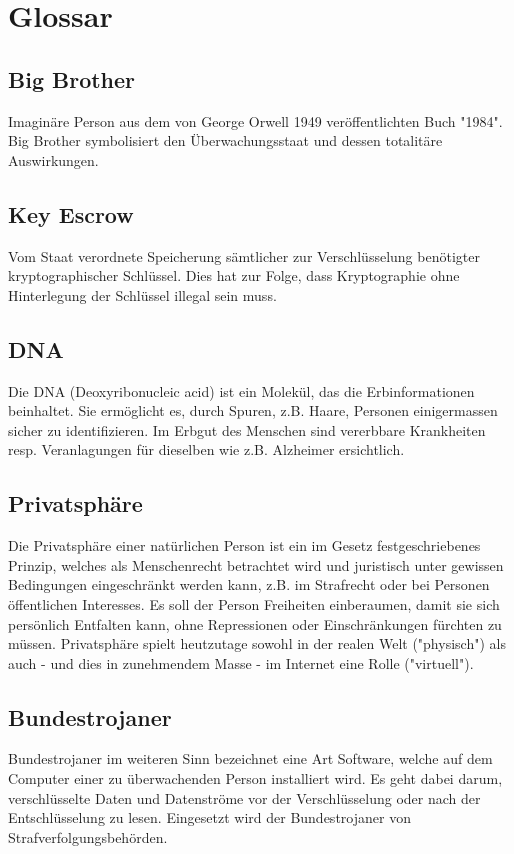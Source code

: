 \section*{
Glossar
}

\subsection*{
Big Brother 
}
Imagin\"are Person aus dem von George Orwell 1949 ver\"offentlichten 
Buch "1984". Big Brother symbolisiert den \"Uberwachungsstaat und dessen 
totalit\"are Auswirkungen. 

\subsection*{
Key Escrow 
}
Vom Staat verordnete Speicherung s\"amtlicher zur Verschl\"usselung 
ben\"otigter kryptographischer Schl\"ussel. Dies hat zur Folge, dass 
Kryptographie ohne Hinterlegung der Schl\"ussel illegal sein muss. 

\subsection*{
DNA 
}
Die DNA (Deoxyribonucleic acid) ist ein Molek\"ul, das die 
Erbinformationen beinhaltet. Sie erm\"oglicht es, durch Spuren, z.B. 
Haare, Personen einigermassen sicher zu identifizieren. Im Erbgut des 
Menschen sind vererbbare Krankheiten resp. Veranlagungen f\"ur dieselben 
wie z.B. Alzheimer ersichtlich. 

\subsection*{
Privatsph\"are 
}
Die Privatsph\"are einer nat\"urlichen Person ist ein im Gesetz 
festgeschriebenes Prinzip, welches als Menschenrecht betrachtet wird und 
juristisch unter gewissen Bedingungen eingeschr\"ankt werden kann, z.B. 
im Strafrecht oder bei Personen \"offentlichen Interesses. Es soll der 
Person Freiheiten einberaumen, damit sie sich pers\"onlich Entfalten 
kann, ohne Repressionen oder Einschr\"ankungen f\"urchten zu m\"ussen. 
Privatsph\"are spielt heutzutage sowohl in der realen Welt ("physisch") 
als auch - und dies in zunehmendem Masse - im Internet eine Rolle 
("virtuell"). 

\subsection*{
Bundestrojaner 
}
Bundestrojaner im weiteren Sinn bezeichnet eine Art Software, welche auf 
dem Computer einer zu \"uberwachenden Person installiert wird. Es geht 
dabei darum, verschl\"usselte Daten und Datenstr\"ome vor der 
Verschl\"usselung oder nach der Entschl\"usselung zu lesen. Eingesetzt 
wird der Bundestrojaner von Strafverfolgungsbeh\"orden. 

